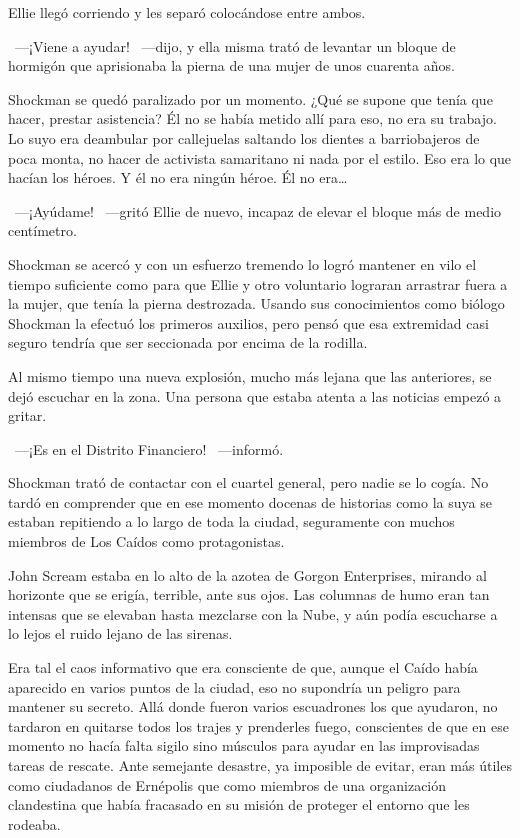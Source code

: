 Ellie llegó corriendo y les separó colocándose entre ambos.

~---¡Viene a ayudar! ~---dijo, y ella misma trató de levantar un bloque de hormigón que aprisionaba la pierna de una mujer de unos cuarenta años.

Shockman se quedó paralizado por un momento. ¿Qué se supone que tenía que hacer, prestar asistencia? Él no se había metido allí para eso, no era su trabajo. Lo suyo era deambular por callejuelas saltando los dientes a barriobajeros de poca monta, no hacer de activista samaritano ni nada por el estilo. Eso era lo que hacían los héroes. Y él no era ningún héroe. Él no era\dots

~---¡Ayúdame! ~---gritó Ellie de nuevo, incapaz de elevar el bloque más de medio centímetro.

Shockman se acercó y con un esfuerzo tremendo lo logró mantener en vilo el tiempo suficiente como para que Ellie y otro voluntario lograran arrastrar fuera a la mujer, que tenía la pierna destrozada. Usando sus conocimientos como biólogo Shockman la efectuó los primeros auxilios, pero pensó que esa extremidad casi seguro tendría que ser seccionada por encima de la rodilla.

Al mismo tiempo una nueva explosión, mucho más lejana que las anteriores, se dejó escuchar en la zona. Una persona que estaba atenta a las noticias empezó a gritar.

~---¡Es en el Distrito Financiero! ~---informó.

Shockman trató de contactar con el cuartel general, pero nadie se lo cogía. No tardó en comprender que en ese momento docenas de historias como la suya se estaban repitiendo a lo largo de toda la ciudad, seguramente con muchos miembros de Los Caídos como protagonistas.

\parbreak
John Scream estaba en lo alto de la azotea de Gorgon Enterprises, mirando al horizonte que se erigía, terrible, ante sus ojos. Las columnas de humo eran tan intensas que se elevaban hasta mezclarse con la Nube, y aún podía escucharse a lo lejos el ruido lejano de las sirenas.

Era tal el caos informativo que era consciente de que, aunque el Caído había aparecido en varios puntos de la ciudad, eso no supondría un peligro para mantener su secreto. Allá donde fueron varios escuadrones los que ayudaron, no tardaron en quitarse todos los trajes y prenderles fuego, conscientes de que en ese momento no hacía falta sigilo sino músculos para ayudar en las improvisadas tareas de rescate. Ante semejante desastre, ya imposible de evitar, eran más útiles como ciudadanos de Ernépolis que como miembros de una organización clandestina que había fracasado en su misión de proteger el entorno que les rodeaba.

